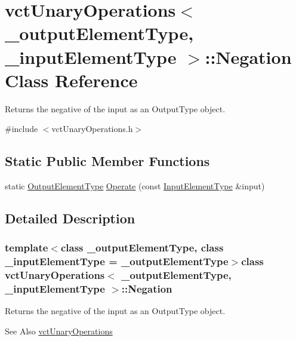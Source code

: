 \hypertarget{classvct_unary_operations_1_1_negation}{\section{vct\-Unary\-Operations$<$ \-\_\-output\-Element\-Type, \-\_\-input\-Element\-Type $>$\-:\-:Negation Class Reference}
\label{classvct_unary_operations_1_1_negation}
}


Returns the negative of the input as an Output\-Type object.  




{\ttfamily \#include $<$vct\-Unary\-Operations.\-h$>$}

\subsection*{Static Public Member Functions}
\begin{DoxyCompactItemize}
\item 
static \hyperlink{classvct_unary_operations_a42306ac3dd20d32c6d6c66ac3fa2e7b9}{Output\-Element\-Type} \hyperlink{classvct_unary_operations_1_1_negation_a747ce0a6ddba1d2a8955955f6d0ab891}{Operate} (const \hyperlink{classvct_unary_operations_abf3b77bb7b8abd7ba72a6a45a65696a7}{Input\-Element\-Type} \&input)
\end{DoxyCompactItemize}


\subsection{Detailed Description}
\subsubsection*{template$<$class \-\_\-output\-Element\-Type, class \-\_\-input\-Element\-Type = \-\_\-output\-Element\-Type$>$class vct\-Unary\-Operations$<$ \-\_\-output\-Element\-Type, \-\_\-input\-Element\-Type $>$\-::\-Negation}

Returns the negative of the input as an Output\-Type object. 

\begin{DoxySeeAlso}{See Also}
\hyperlink{classvct_unary_operations}{vct\-Unary\-Operations} 
\end{DoxySeeAlso}


